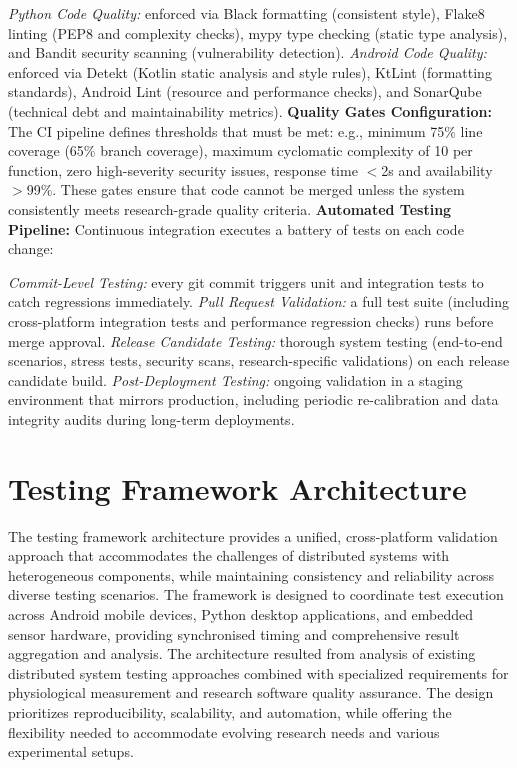 \documentclass[11pt,a4paper]{report}
\begin{document}
\textit{Python Code Quality:} enforced via Black formatting (consistent style), Flake8 linting (PEP8 and complexity checks), mypy type checking (static type analysis), and Bandit security scanning (vulnerability detection).
\textit{Android Code Quality:} enforced via Detekt (Kotlin static analysis and style rules), KtLint (formatting standards), Android Lint (resource and performance checks), and SonarQube (technical debt and maintainability metrics).
\textbf{Quality Gates Configuration:} The CI pipeline defines thresholds that must be met: e.g., minimum 75\% line coverage (65\% branch coverage), maximum cyclomatic complexity of 10 per function, zero high-severity security issues, response time $<$2s and availability $>$99\%. These gates ensure that code cannot be merged unless the system consistently meets research-grade quality criteria.
\textbf{Automated Testing Pipeline:} Continuous integration executes a battery of tests on each code change:

\textit{Commit-Level Testing:} every git commit triggers unit and integration tests to catch regressions immediately.
\textit{Pull Request Validation:} a full test suite (including cross-platform integration tests and performance regression checks) runs before merge approval.
\textit{Release Candidate Testing:} thorough system testing (end-to-end scenarios, stress tests, security scans, research-specific validations) on each release candidate build.
\textit{Post-Deployment Testing:} ongoing validation in a staging environment that mirrors production, including periodic re-calibration and data integrity audits during long-term deployments.
\section{Testing Framework Architecture}
The testing framework architecture provides a unified, cross-platform validation approach that accommodates the challenges of distributed systems with heterogeneous components, while maintaining consistency and reliability across diverse testing scenarios. The framework is designed to coordinate test execution across Android mobile devices, Python desktop applications, and embedded sensor hardware, providing synchronised timing and comprehensive result aggregation and analysis.
The architecture resulted from analysis of existing distributed system testing approaches combined with specialized requirements for physiological measurement and research software quality assurance. The design prioritizes reproducibility, scalability, and automation, while offering the flexibility needed to accommodate evolving research needs and various experimental setups.
\end{document}
